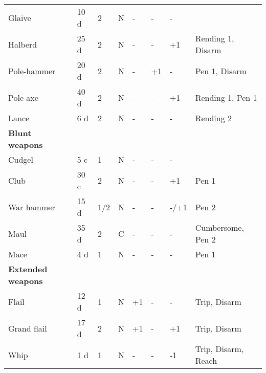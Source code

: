 \documentclass[a4paper,11pt,oneside]{book}
\newcommand{\textlf}[1]{\textbf{\titlecap{#1}}}
\begin{document}
\begin{table}[ht!]
\begin{tabular}{|l|l|l|l|l|l|l|l|}
		Glaive & 10 d & 2 & N & - & - & - & \textlf{damage edge+} \\
		Halberd & 25 d & 2 & N & - & - & +1 & Rending 1, Disarm\\
		Pole-hammer & 20 d & 2 & N & - & +1 & - & Pen 1, Disarm\\ 
		Pole-axe & 40 d & 2 & N & - & - & +1 & Rending 1, Pen 1 \\
		Lance & 6 d & 2 & N & - & - & - & Rending 2\\
		\hline
		\textbf{Blunt weapons} & & & & & & & \\
		\hline
		Cudgel & 5 c & 1  & N & - & - & - &  \\
		Club & 30 c & 2 & N & - & - & +1 & Pen 1 \\
		War hammer & 15 d & 1/2 & N & - & - & -/+1 & Pen 2 \\ 
		Maul & 35 d & 2 & C & - & - & - & Cumbersome, Pen 2 \\
		Mace & 4 d & 1 & N & - & - & - & Pen 1 \\
		\hline
		\textbf{Extended weapons} & & & & & & & \\
		\hline
		Flail & 12 d & 1 & N & +1 & - & - & Trip, Disarm \\ 
		Grand flail & 17 d & 2 & N & +1 & - & +1 & Trip, Disarm\\
		Whip & 1 d & 1 & N & - & - & -1 & Trip, Disarm, Reach\\
		\hline
	\end{tabular}
\end{table}
\end{document}
